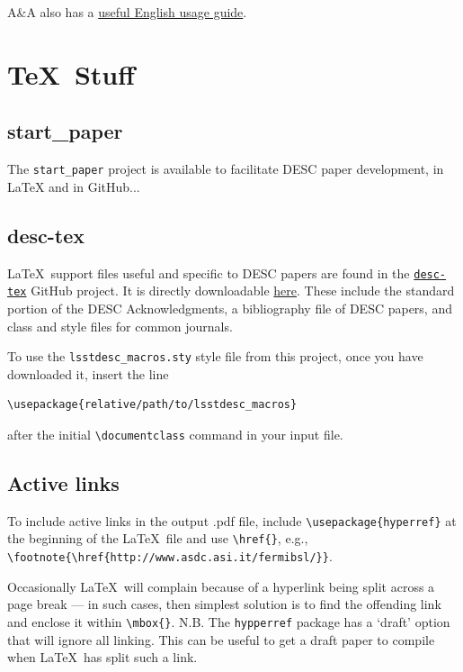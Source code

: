 \documentclass[letterpaper,11pt]{article}
\begin{document}
A\&A also has a \href{http://www.aanda.org/doc_journal/instructions/aa_english_guide.pdf}{useful English usage guide}. 

\section{\TeX\ Stuff}

\subsection{start\_paper}

The {\tt start\_paper} project is available to facilitate DESC paper development, in LaTeX and in GitHub...

\subsection{desc-tex}

La\TeX\ support files useful and specific to DESC papers are found in
the \href{https://github.com/LSSTDESC/desc-tex}{\tt desc-tex} GitHub project.  It is directly downloadable \href{https://raw.githubusercontent.com/LSSTDESC/desc-tex/master/styles/lsstdesc_macros.sty?token=AKdGNisspyfcn5HL4yoV16o5vQh58v13ks5ZVaazwA\%3D\%3D}{here}.  
These include the standard portion of the DESC Acknowledgments, a bibliography file of DESC papers, and class and style files for common journals.

To use the {\tt lsstdesc\_macros.sty} style file from this project, once you have downloaded it, insert the line
\begin{verbatim}
\usepackage{relative/path/to/lsstdesc_macros}
\end{verbatim}
after the initial \verb|\documentclass| command in your input
file.

\subsection{Active links}

To include active links in the output .pdf file, include 
\verb|\usepackage{hyperref}| at the beginning of the La\TeX\ file and use
\verb|\href{}|, e.g., \verb|\footnote{\href{http://www.asdc.asi.it/fermibsl/}}|.

Occasionally La\TeX\ will complain because of a hyperlink being split across
a page break --- in such cases, then simplest solution is to find the
offending link and enclose it within \verb|\mbox{}|.  N.B. The {\tt hypperref} package has a `draft' option that will ignore all linking.  This can be useful to get a draft paper to compile when La\TeX\ has split such a link.
\end{document}
